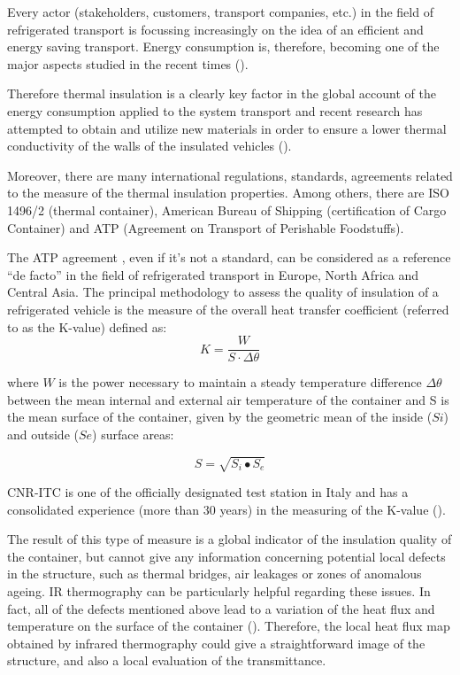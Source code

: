 \documentclass{tQRT2e}
\begin{document}
Every actor (stakeholders, customers, transport companies, etc.) in the field of refrigerated transport is focussing increasingly on the idea of an efficient and energy saving transport. Energy consumption is, therefore, becoming one of the major aspects studied in the recent times (\cite{Tassou2009,Cavalier2010,Adekomaya2017}). 

Therefore thermal insulation is a clearly key factor in the global account of the energy consumption applied to the system transport and recent research has attempted to obtain and utilize new materials in order to ensure a lower thermal conductivity of the walls of the insulated vehicles (\cite{Tinti2014,Lawton2016}).

Moreover, there are many international regulations, standards, agreements related to the measure of the thermal insulation properties. Among others, there are ISO 1496/2 (thermal container), American Bureau of Shipping (certification of Cargo Container) and ATP (Agreement on Transport of Perishable Foodstuffs).

The ATP agreement \cite{Geneva1970}, even if it’s not a standard, can be considered as a reference “de facto” in the field of refrigerated transport in Europe, North Africa and Central Asia. The principal methodology to assess the quality of insulation of a refrigerated vehicle is the measure of the overall heat transfer coefficient (referred to as the K-value) defined as:
\begin{equation}
K=\frac{W}{S⋅\Delta \theta}
\end{equation}


where $ W $ is the power necessary to maintain a steady temperature difference $ \Delta \theta $ between the mean internal and external air temperature of the container and S is the mean surface of the container, given by the geometric mean of the inside ($ Si $) and outside ($ Se $) surface areas:

\begin{equation}
S=\sqrt{S_i∙S_e}
\end{equation}

CNR-ITC is one of the officially designated test station in Italy and has a consolidated experience (more than 30 years) in the measuring of the K-value (\cite{rossi2009k}).

The result of this type of measure is a global indicator of the insulation quality of the container, but cannot give any information concerning potential local defects in the structure, such as thermal bridges, air leakages or zones of anomalous ageing. IR thermography can be particularly helpful regarding these issues. In fact, all of the defects mentioned above lead to a variation of the heat flux and temperature on the surface of the container (\cite{grinzato2010r, grinzatoquality, grinzato1comparison}). Therefore, the local heat flux map obtained by infrared thermography could give a straightforward image of the structure, and also a local evaluation of the transmittance.
\end{document}
